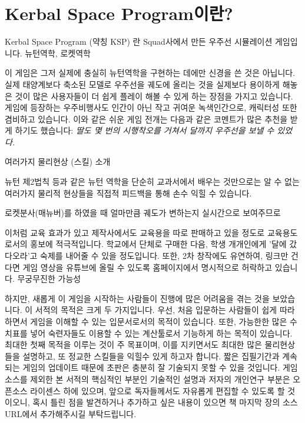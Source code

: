 \chapter*{Kerbal Space Program이란?}
Kerbal Space Program (약칭 KSP) 란 Squad사에서 만든 우주선 시뮬레이션 게임입니다.
뉴턴역학, 로켓역학

이 게임은 그저 실제에 충실히 뉴턴역학을 구현하는 데에만 신경을 쓴 것은 아닙니다. 
실제 태양계보다 축소된 모델로 우주선을 궤도에 올리는 것을 실제보다 용이하게 해놓은 것이 많은 사용자들이 더 쉽게 플레이 해볼 수 있게 하는 장점을 가지고 있습니다.
게임에 등장하는 우주비행사도 인간이 아닌 작고 귀여운 녹색인간으로, 캐릭터성 또한 겸비하고 있습니다.
이와 같은 쉬운 게임 전개는 다음과 같은 코멘트가 많은 추천을 받게 하기도 했습니다:
\emph{딸도 몇 번의 시행착오를 거쳐서 달까지 우주선을 보낼 수 있었다.}


여러가지 물리현상 (스킬) 소개

뉴턴 제2법칙 등과 같은 뉴턴 역학을 단순히 교과서에서 배우는 것만으로는 알 수 없는
여러가지 물리적 현상들을 직접적 피드백을 통해 손수 익힐 수 있습니다.

로켓분사(매뉴버)를 하였을 때 얼마만큼 궤도가 변하는지 실시간으로 보여주므로 

이처럼 교육 효과가 있고
제작사에서도 교육용을 따로 판매하고 있을 정도로 교육용도로서의 홍보에 적극적입니다.
학교에서 단체로 구매한 다음, 학생 개개인에게 '달에 갔다오라'고 숙제를 내어줄 수 있을 정도입니다.
또한, 2차 창작에도 유연하여, 링크만 건다면 게임 영상을 유튜브에 올릴 수 있도록 홈페이지에서 명시적으로 허락하고 있습니다.
무궁무진한 가능성



하지만, 새롭게 이 게임을 시작하는 사람들이 진행에 많은 어려움을 겪는 것을 보았습니다. 이 서적의 목적은 크게 두 가지입니다. 
우선, 처음 입문하는 사람들이 쉽게 따라하면서 게임을 이해할 수 있는 입문서로서의 목적이 있습니다.
또한, 가능한한 많은 수치표를 넣어 숙련자들도 이용할 수 있는 계산툴로서 기능하게 하는 목적이 있습니다.
최대한 첫째 목적을 이루는 것이 주 목표이며, 이를 지키면서도 최대한 많은 물리현상들을 설명하고, 또 정교한 스킬들을 익힐수 있게 하고자 합니다.
짧은 집필기간과 계속되는 게임의 업데이트 때문에 초판은 충분히 잘 기술되지 못할 수 있을 것입니다.
게임소스를 제외한 본 서적의 핵심적인 부분인 기술적인 설명과 저자의 개인연구 부분은 오픈소스 라이센스 하에 있으며, 앞으로 독자들께서도 자유롭게 편집할 수 있도록 할 것이오니,
혹시 틀린 점을 발견하거나 추가하고 싶은 내용이 있으면 책 마지막 장의 소스 URL에서 추가해주시길 부탁드립니다.

